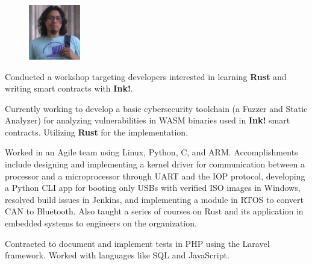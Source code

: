 


\begin{figure}
	\vspace*{-0.5cm}
	\hfill\includegraphics[width=0.2\textwidth]{photo2.jpeg}
	\vspace{-5cm}
\end{figure}
\sepspace




{Conducted a workshop targeting developers interested in learning \textbf{Rust}
  and writing smart contracts with \textbf{Ink!}.}

{Currently working to develop a basic cybersecurity toolchain
  (a Fuzzer and Static Analyzer) for analyzing vulnerabilities
  in WASM binaries used in \textbf{Ink!} smart contracts.
  Utilizing \textbf{Rust} for the implementation.}

{Worked in an Agile team using Linux, Python, C, and ARM.
  Accomplishments include designing and implementing a kernel driver
  for communication between a processor and a microprocessor through UART and the IOP protocol,
  developing a Python CLI app for booting only USBs with verified ISO images in Windows,
  resolved build issues in Jenkins,
  and implementing a module in RTOS to convert CAN to Bluetooth.
  Also taught a series of courses on Rust and its application in embedded systems to engineers on the organization. }

{Contracted to document and implement tests in PHP using the Laravel framework.
  Worked with languages like SQL and JavaScript.}


